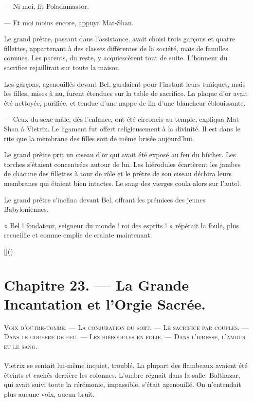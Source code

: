 \documentclass[a4paper, 11pt, oneside, polutonikogreek, french]{article}
\begin{document}
--- Ni moi, fit Poladamastor.

--- Et moi moins encore, appuya Mat-Shan.

Le grand prêtre, passant dans l'assistance, avait choisi trois garçons et quatre fillettes, appartenant à des classes différentes de la société, mais de familles connues. Les parents, du reste, y acquiescèrent tout de suite. L'honneur du sacrifice rejaillirait sur toute la maison.

\bigskip
\centerline{\EightStarTaper}
\centerline{\EightStarTaper\EightStarTaper}
\bigskip

Les garçons, agenouillés devant Bel, gardaient pour l'instant leurs tuniques, mais les filles, mises à nu, furent étendues sur la table de sacrifice. La plaque d'or avait été nettoyée, purifiée, et tendue d'une nappe de lin d'une blancheur éblouissante.

--- Ceux du sexe mâle, dès l'enfance, ont été circoncis au temple, expliqua Mat-Shan à Vietrix. Le ligament fut offert religieusement à la divinité. Il est dans le rite que la membrane des filles soit de même brisée aujourd'hui.

Le grand prêtre prit un ciseau d'or qui avait été exposé au feu du bûcher. Les torches s'étaient concentrées autour de lui. Les hiérodules écartèrent les jambes de chacune des fillettes à tour de rôle et le prêtre de son ciseau déchira leurs membranes qui étaient bien intactes. Le sang des vierges coula alors sur l'autel.

Le grand prêtre s'inclina devant Bel, offrant les prémices des jeunes Babyloniennes.

« Bel ! fondateur, seigneur du monde ! roi des esprits ! » répétait la foule, plus recueillie et comme emplie de crainte maintenant.

[]()
\clearpage
\section{Chapitre 23. --- La Grande Incantation et l'Orgie Sacrée.}
\begin{center}
\scshape
\small
Voix d'outre-tombe. --- La conjuration du sort. --- Le sacrifice par couples. --- Dans le gouffre de feu. --- Les hiérodules en folie. --- Dans l'ivresse, l'amour et le sang.
\end{center}
\paragraph{}
Vietrix se sentait lui-même inquiet, troublé. La plupart des flambeaux avaient été éteints et cachés derrière les colonnes. L'ombre régnait dans la salle. Balthazar, qui avait suivi toute la cérémonie, impassible, s'était agenouillé. On n'entendait plus aucune voix, aucun bruit.
\end{document}
